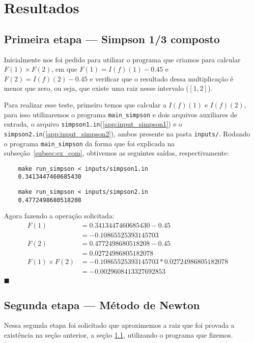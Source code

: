 \chapter{Resultados}
\section{Primeira etapa --- Simpson 1/3 composto}
\label{sec:resultadoSimpson}
Inicialmente nos foi pedido para utilizar o programa que criamos para calcular
\(F(1)\times F(2)\), em que \(F(1) = I(f)(1) - 0.45\) e  \(F(2) = I(f)(2) -
0.45\) e verificar que o resultado dessa multiplicação é menor que zero, ou
seja, que existe uma raiz nesse intervalo (\([1, 2]\)).

Para realizar esse teste, primeiro temos que calcular a \(I(f)(1)\) e
\(I(f)(2)\), para isso utilizaremos o programa \texttt{main\_simpson} e dois
arquivos auxiliares de entrada, o arquivo
\texttt{simpson1.in}(\ref{app:input_simpson1}) e o
\texttt{simpson2.in}(\ref{app:input_simpson2}), ambos presente na pasta
\texttt{inputs/}. Rodando o programa \texttt{main\_simpson} da forma que foi
explicada na subseção~\ref{subsec:ex_com}, obtivemos as seguintes saídas,
respectivamente:

\begin{verbatim}
	make run_simpson < inputs/simpson1.in
	0.3413447460685430
\end{verbatim}

\begin{verbatim}
	make run_simpson < inputs/simpson2.in
	0.4772498680518208
\end{verbatim}

Agora fazendo a operação solicitada:
\begin{align*}
F(1) &=  0.3413447460685430 - 0.45\\
     &= -0.10865525393145703\\
F(2) &=  0.4772498680518208 - 0.45\\
     &=  0.02724986805182078\\
F(1) \times F(2) &= -0.10865525393145703 * 0.02724986805182078\\
                 &= -0.0029608413327692853\\
\end{align*}
\hfill\(\blacksquare\)

\section{Segunda etapa --- Método de Newton}
Nessa segunda etapa foi solicitado que aproximemos a raiz que foi provada a
existência na seção anterior, a seção \ref{sec:resultadoSimpson}, utilizando o
programa que fizemos.

